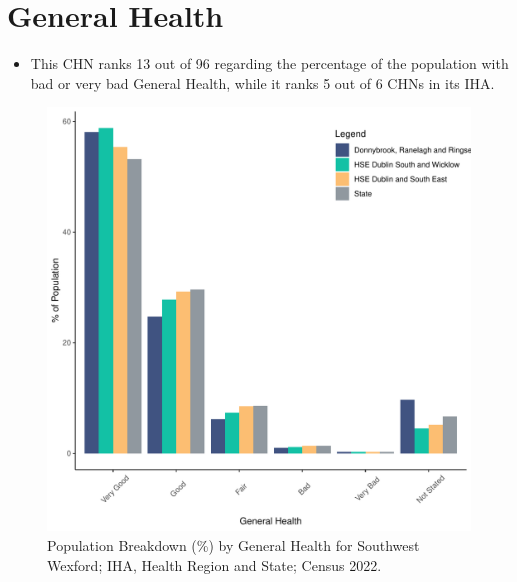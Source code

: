 \documentclass{article}
\begin{document}
\pagebreak

\section{General Health}\label{sect:GenHealth}
\begin{itemize}
\item  This CHN ranks  13 out of 96 regarding the percentage of the population with bad or very bad General Health, while it ranks   5 out of 6 CHNs in its IHA.
\end{itemize}
\begin{figure}[h]
	\centering
	\includegraphics[width = 150mm]{../figures/GenED.pdf}
	\caption{Population Breakdown (\%) by General Health for Southwest Wexford; IHA, Health Region and State;  Census 2022.}
	\label{fig:2ae19629-1a6a-13a3-e055-000000000001}
	\end{figure}
\end{document}
